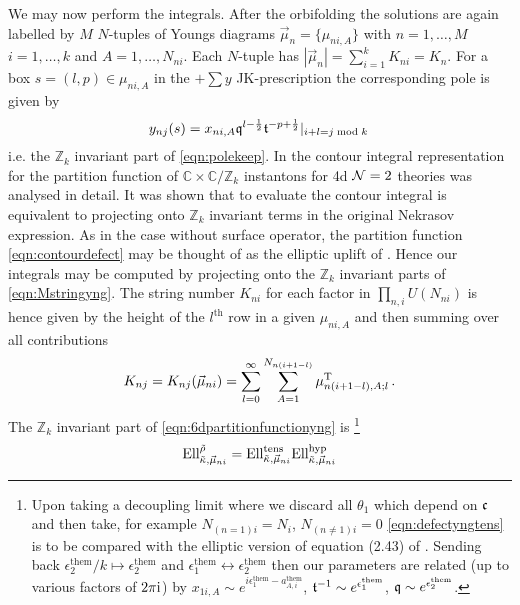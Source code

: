 \documentclass[main.tex]{subfiles}
\begin{document}
We may now perform the integrals. After the orbifolding the solutions are again labelled by $M$ $N$-tuples of Youngs diagrams $\vec{\mu}_n=\{\mu_{ni,A}\}$ with $n=1,\dots,M$ $i=1,\dots,k$ and $A=1,\dots, N_{ni}$. Each $N$-tuple has $|\vec{\mu}_n|=\sum_{i=1}^kK_{ni}=K_{n}$. For a box $s=\left(l,p\right)\in \mu_{ni,A}$ in the $+\sum y$ JK-prescription the corresponding pole is given by
\begin{equation}\label{eqn:res}
y_{nj}(s)=x_{ni,A}\mathfrak{q}^{l-\frac{1}{2}}\mathfrak{t}^{-p+\frac{1}{2}}|_{i+l=j\bmod k}\,
\end{equation}
i.e. the $\mathbb{Z}_{k}$ invariant part of \eqref{eqn:polekeep}. In \cite{Gorsky:2017hro} the contour integral representation for the partition function of $\mathbb{C}\times\mathbb{C}/\mathbb{Z}_k$ instantons for 4d $\mathcal{N}=2$ theories was analysed in detail. It was shown that to evaluate the contour integral is equivalent to projecting onto $\mathbb{Z}_k$ invariant terms in the original Nekrasov expression. As in the case without surface operator, the partition function \eqref{eqn:contourdefect} may be thought of as the elliptic uplift of \cite{Gorsky:2017hro}. Hence our integrals may be computed by projecting onto the $\mathbb{Z}_k$ invariant parts of \eqref{eqn:Mstringyng}. The string number $K_{ni}$ for each factor in $\prod_{n,i}U(N_{ni})$ is hence given by the height of the $l^{\text{th}}$ row in a given $\mu_{ni,A}$ and then summing over all contributions
\begin{equation}\label{eqn:Kni}
K_{nj}=K_{nj}(\vec{\mu}_{ni})=\sum_{l=0}^{\infty}\sum_{A=1}^{N_{n(i+1-l)}}\mu^{\operatorname{T}}_{n(i+1-l),A;l}\,.
\end{equation}
The $\mathbb{Z}_k$ invariant part of \eqref{eqn:6dpartitionfunctionyng} is \cite{Gorsky:2017hro,Kanno:2011fw} \footnote{Upon taking a decoupling limit where we discard all $\theta_1$ which depend on $\mathfrak{c}$ and then take, for example $N_{(n=1)i}=N_i$, $N_{(n\neq 1)i}=0$ \eqref{eqn:defectyngtens} is to be compared with the elliptic version of equation (2.43) of \cite{Kanno:2011fw}. Sending back $\epsilon_2^{\text{them}}/k\mapsto\epsilon_2^{\text{them}}$ and $\epsilon_1^{\text{them}}\leftrightarrow\epsilon_2^{\text{them}}$ then our parameters are related (up to various factors of $2\pi\mathrm{i}$) by $x_{1i,A}\sim e^{i\epsilon_1^{\text{them}}-a^{\text{them}}_{A,i}}$, $\mathfrak{t}^{-1}\sim e^{\epsilon_1^{\text{them}}}$, $\mathfrak{q}\sim e^{\epsilon_2^{\text{them}}}$.} 
\begin{equation}
\textrm{Ell}_{\tilde{\kappa},\vec{\mu}_{ni}}^{\tilde{\rho}}=\textrm{Ell}_{\tilde{\kappa},\vec{\mu}_{ni}}^{\text{tens}}\textrm{Ell}_{\tilde{\kappa},\vec{\mu}_{ni}}^{\text{hyp}}
\end{equation}
\end{document}
